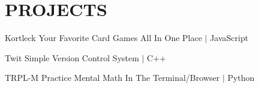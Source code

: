 \section{\textbf {\large PROJECTS}}
\resumeSubHeadingListStart %

    \resumeSubheading %
    {Kortleck}{}
    {Your Favorite Card Games All In One Place $ | $ JavaScript}{}
    \resumeItemListStart %
        \resumeItem{}
        \resumeItem{}
        \resumeItem{}
    \resumeItemListEnd %
    
    \resumeSubheading %
    {Twit}{}
    {Simple Version Control System $ | $ C++}{}
    \resumeItemListStart %
        \resumeItem{}
        \resumeItem{}
        \resumeItem{}
    \resumeItemListEnd %

    \resumeSubheading %
    {TRPL-M}{}
    {Practice Mental Math In The Terminal/Browser $ | $ Python}{}
    \resumeItemListStart %
        \resumeItem{}
        \resumeItem{}
    \resumeItemListEnd %
    

\resumeSubHeadingListEnd %